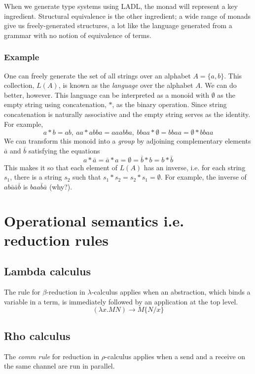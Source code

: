 \documentclass[12pt]{article}
\numberwithin{equation}{section}
\begin{document}
When we generate type systems using LADL, the monad will represent a key ingredient. Structural equivalence is the other ingredient; a wide range of monads give us freely-generated structures, a lot like the language generated from a grammar with no notion of equivalence of terms.

\subsubsection{Example}
One can freely generate the set of all strings over an alphabet $A=\{ a,b \}$. This collection, $L(A)$, is known as the \emph{language} over the alphabet $A$. We can do better, however. This language can be interpreted as a monoid with $\emptyset$ as the empty string using concatenation, $*$, as the binary operation. Since string concatenation is naturally associative and the empty string serves as the identity. For example, 
\[ a*b=ab, \ aa*abba=aaabba, \ bbaa*\emptyset = bbaa = \emptyset * bbaa \]
We can transform this monoid into a \emph{group} by adjoining complementary elements $\bar{a}$ and $\bar{b}$ satisfying the equations
\[ a * \bar{a} = \bar{a} * a = \emptyset = \bar{b} * b = b * \bar{b} \]
This makes it so that each element of $L(A)$ has an inverse, i.e. for each string $s_1$, there is a string $s_2$ such that $s_1 * s_2 = s_2 * s_1 = \emptyset$. For example, the inverse of $ab \bar{a} \bar{a} \bar{b}$ is $baa \bar{b} \bar{a}$ (why?).

\section{Operational semantics i.e. reduction rules}

\subsection{Lambda calculus}
The rule for $\beta$-reduction in $\lambda$-calculus applies when an abstraction, which binds a variable in a term, is immediately followed by an application at the top level.
\[ (\lambda x.M N) \rightarrow M\{ N/x \}\]

\subsection{Rho calculus}
The \emph{comm rule} for reduction in $\rho$-calculus applies when a send and a receive on the same channel are run in parallel. \\
\end{document}
